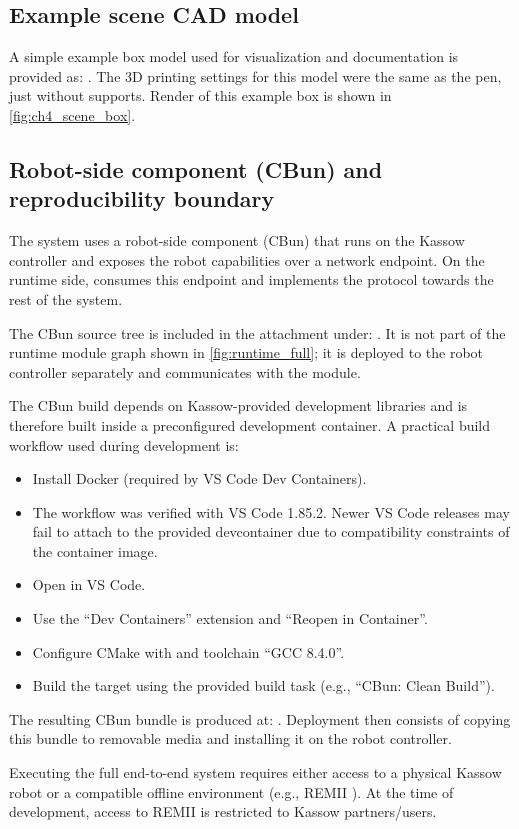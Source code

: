 \subsection{Example scene CAD model}
\label{appendix:scene_cad}

A simple example box model used for visualization and documentation is provided as:
. The 3D printing settings for this model were the same as the pen, just without supports. 
Render of this example box is shown in \autoref{fig:ch4_scene_box}.

\subsection{Robot-side component (CBun) and reproducibility boundary}
\label{appendix:cbun}

The system uses a robot-side component (CBun) that runs on the Kassow controller and exposes the robot capabilities over a network endpoint.
On the runtime side,  consumes this endpoint and implements the  protocol towards the rest of the system.

The CBun source tree is included in the attachment under:
.
It is not part of the runtime module graph shown in \autoref{fig:runtime_full}; it is deployed to the robot controller separately and communicates with the  module.

The CBun build depends on Kassow-provided development libraries and is therefore built inside a preconfigured development container.
A practical build workflow used during development is:

\begin{itemize}
    \item Install Docker (required by VS Code Dev Containers).
    \item The workflow was verified with VS Code 1.85.2. Newer VS Code releases may fail to attach to the provided devcontainer due to compatibility constraints of the container image.
    \item Open  in VS Code.
    \item Use the ``Dev Containers'' extension and ``Reopen in Container''.
    \item Configure CMake with  and toolchain ``GCC 8.4.0''.
    \item Build the target using the provided build task (e.g., ``CBun: Clean Build'').
\end{itemize}

The resulting CBun bundle is produced at:
.
Deployment then consists of copying this bundle to removable media and installing it on the robot controller.

Executing the full end-to-end system requires either access to a physical Kassow robot or a compatible offline environment (e.g., REMII \cite{kassow_remii}).
At the time of development, access to REMII is restricted to Kassow partners/users.

